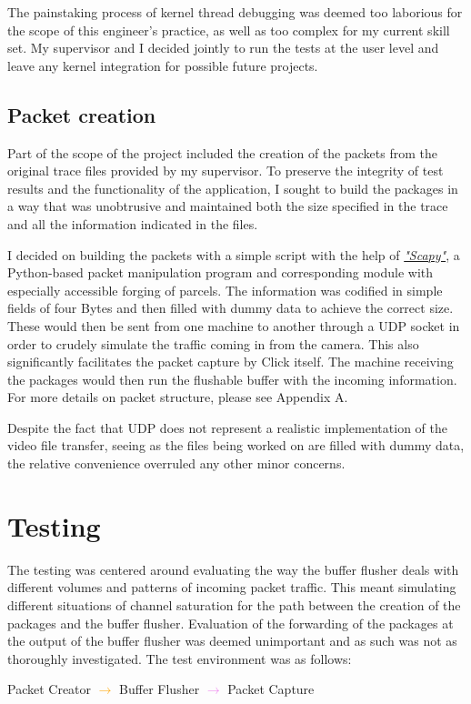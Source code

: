The painstaking process of kernel thread debugging was deemed too laborious for the scope of this engineer's practice, as well as too complex for my current skill set. My supervisor and I decided jointly to run the tests at the user level and leave any kernel integration for possible future projects.

\section{Packet creation}

Part of the scope of the project included the creation of the packets from the original trace files provided by my supervisor. To preserve the integrity of test results and the functionality of the application, I sought to build the packages in a way that was unobtrusive and maintained both the size specified in the trace and all the information indicated in the files. 

I decided on building the packets with a simple script with the help of \href{http://www.secdev.org/projects/scapy/}{\textit{"Scapy"}}, a Python-based packet manipulation program and corresponding module with especially accessible forging of parcels. The information was codified in simple fields of four Bytes and then filled with dummy data to achieve the correct size. These would then be sent from one machine to another through a UDP socket in order to crudely simulate the traffic coming in from the camera. This also significantly facilitates the packet capture by Click itself. The machine receiving the packages would then run the flushable buffer with the incoming information. For more details on packet structure, please see Appendix A.

Despite the fact that UDP does not represent a realistic implementation of the video file transfer, seeing as the files being worked on are filled with dummy data, the relative convenience overruled any other minor concerns. 

\chapter{Testing}

The testing was centered around evaluating the way the buffer flusher deals with different volumes and patterns of incoming packet traffic. This meant simulating different situations of channel saturation for the path between the creation of the packages and the buffer flusher. Evaluation of the forwarding of the packages at the output of the buffer flusher was deemed unimportant and as such was not as thoroughly investigated. The test environment was as follows:
\vspace{3mm}
\begin{center}
Packet Creator \textcolor{orange}{$\rightarrow$} Buffer Flusher \textcolor{violet}{$\rightarrow$} Packet Capture
\end{center}
\vspace{3mm}

